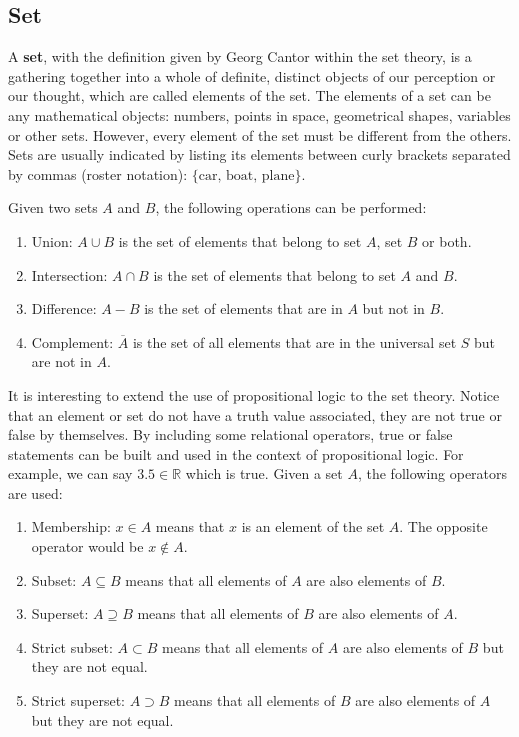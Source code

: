         \subsection*{Set}
\vspace{-0.5cm}
A \textbf{set}, with the definition given by Georg Cantor within the set theory, 
is a gathering together into a whole of definite, distinct objects of our perception or our thought, 
which are called elements of the set.
The elements of a set can be any mathematical objects: numbers, points in space, geometrical shapes, variables or other sets.
However, every element of the set must be different from the others.
Sets are usually indicated by listing its elements between curly brackets separated by commas (roster notation): $\{\textrm{car, boat, plane}\}$.

Given two sets $A$ and $B$, the following operations can be performed:
\begin{enumerate}[noitemsep]
    \item Union: $A\cup B$ is the set of elements that belong to set $A$, set $B$ or both.
    \item Intersection: $A\cap B$ is the set of elements that belong to set $A$ and $B$.
    \item Difference: $A - B$ is the set of elements that are in $A$ but not in $B$.
    \item Complement: $\overline{A}$ is the set of all elements that are in the universal set $S$ but are not in $A$.
\end{enumerate}
It is interesting to extend the use of propositional logic to the set theory. 
Notice that an element or set do not have a truth value associated, they are not true or false by themselves. 
By including some relational operators, true or false statements can be 
built and used in the context of propositional logic. 
For example, we can say $3.5 \in \mathbb{R}$ which is true. 
Given a set $A$, the following operators are used:
\begin{enumerate}[noitemsep]
    \item Membership: $x\in A$ means that $x$ is an element of the set $A$. The opposite operator would be $x\notin A$.
    \item Subset: $A \subseteq B$ means that all elements of $A$ are also elements of $B$.
    \item Superset: $A \supseteq B$ means that all elements of $B$ are also elements of $A$.
    \item Strict subset: $A \subset B$ means that all elements of $A$ are also elements of $B$ but they are not equal.
    \item Strict superset: $A \supset B$ means that all elements of $B$ are also elements of $A$ but they are not equal.
\end{enumerate}



